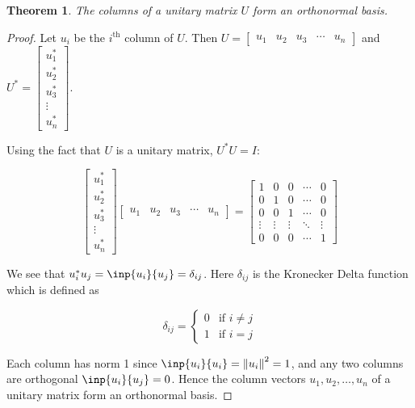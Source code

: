 \documentclass[twoside]{article}
\newcommand*\adj[1]{#1^*}
\newcommand*\norm[1]{\left \Vert #1 \right\Vert}
\theoremstyle{plain}
\newtheorem{theorem}{Theorem}
\theoremstyle{definition}
\theoremstyle{remark}
\begin{document}
\begin{theorem} The columns of a unitary matrix \(U\) form an orthonormal basis. \end{theorem}
\begin{proof}  Let \(u_i\) be the \(i^\text{th}\) column of \(U\). Then \(U = \begin{bmatrix} u_1 & u_2 & u_3 & \cdots & u_n \end{bmatrix}\) and \(\adj{U} = \begin{bmatrix} \adj{u_1} \\ \adj{u_2} \\ \adj{u_3} \\ \vdots \\ \adj{u_n} \end{bmatrix} \). 

Using the fact that \(U\) is a unitary matrix, \(\adj{U} U = I\):

\[  \begin{bmatrix} \adj{u_1} \\ \adj{u_2} \\ \adj{u_3} \\ \vdots \\ \adj{u_n} \end{bmatrix} \begin{bmatrix} u_1 & u_2 & u_3 & \cdots & u_n \end{bmatrix} = \begin{bmatrix} 1 & 0 & 0 & \cdots & 0 \\
0 & 1 & 0 & \cdots & 0 \\
0 & 0 & 1 & \cdots & 0 \\
\vdots & \vdots & \vdots & \ddots & \vdots \\
0 & 0 & 0 & \cdots & 1\end{bmatrix}\]

We see that \(\adj{u_i} u_j = \inp{u_i}{u_j} = \delta_{ij}\). Here \(\delta_{ij}\) is the Kronecker Delta function which is defined as

\[\delta_{ij} = \begin{cases} 
0 & \text{if } i \ne j \\
1 & \text{if } i = j \end{cases}
 \]


Each column has norm 1 since \(\inp{u_i}{u_i}= \norm{u_i}^2  =1\), and any two columns are orthogonal \(\inp{u_i}{u_j} = 0\). Hence the column vectors \(u_1, u_2, \ldots , u_n\) of a unitary matrix form an orthonormal basis.
    \end{proof}
\end{document}
